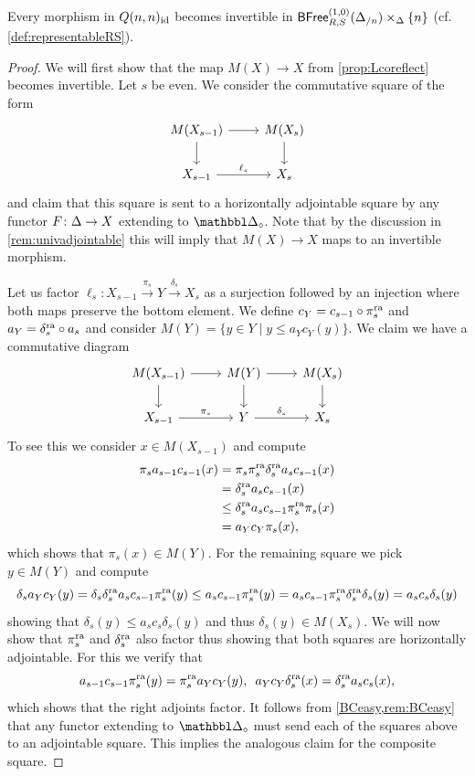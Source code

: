 \documentclass[a4paper,reqno,twoside]{amsart}
\begin{document}
\begin{lemma}\label{lem:deltaisos}
	Every morphism in $Q(n,n)_{\mathrm{id}}$ becomes invertible in $\mathsf{BFree}^{(1,0)}_{R,S}(\Delta_{/n})\times_\Delta \{n\}$ (cf. \cref{def:representableRS}).
\end{lemma}
\begin{proof}
	We will first show that the map $M(X)\to X$ from \cref{prop:Lcoreflect} becomes invertible. Let $s$ be even. We consider the commutative square of the form
	\[
		\begin{tikzcd}
			M(X_{s-1}) \arrow[r] \arrow[d] &  M(X_{s}) \arrow[d] \\
			X_{s-1} \arrow[r,"\ell_s"] & X_{s}
		\end{tikzcd}
	\] 
	and claim that this square is sent to a horizontally adjointable square by any functor $F \colon \Delta \to \relax{X}$ extending to $\ddelta_{\diamond}$. Note that by the discussion in \cref{rem:univadjointable} this will imply that $M(X)\to X$ maps to an invertible morphism.
	
	
	Let us factor $\ell_s\colon X_{s-1}\xrightarrow{\pi_s}Y \xrightarrow{\delta_s} X_{s}$ as a surjection followed by an injection where both maps preserve the bottom element. We define $c_{Y}=c_{s-1} \circ \pi_{s}^{\mathrm{ra}}$ and $a_{Y}=\delta_s^{\mathrm{ra}}\circ a_s$ and consider $M(Y)=\{y \in Y \mid y \leq a_{Y}c_{Y}(y)\}$. We claim we have a commutative diagram
	\[
		\begin{tikzcd}
			M(X_{s-1}) \arrow[d] \arrow[r] & M(Y) \arrow[d] \arrow[r] & M(X_s) \arrow[d] \\
			X_{s-1} \arrow[r,"\pi_s"] & Y \arrow[r,"\delta_s"] & X_s
		\end{tikzcd}
	\]
	To see this we consider $x \in M(X_{s-1})$ and compute
	\[
		\begin{aligned}
			\pi_s a_{s-1}c_{s-1}(x)
			&= \pi_s \pi_s^{\mathrm{ra}} \delta_s^{\mathrm{ra}}a_s c_{s-1}(x) \\
			&= \delta_s^{\mathrm{ra}}a_s c_{s-1}(x) \\
			&\leq \delta_s^{\mathrm{ra}}a_s c_{s-1}\pi_s^{\mathrm{ra}}\pi_s(x) \\
			&= a_Yc_Y\pi_s(x),
		\end{aligned}
	\]
	which shows that $\pi_s(x)\in M(Y)$. For the remaining square we pick $y \in M(Y)$ and compute
	\[
		\delta_s a_Y c_Y(y)=\delta_s \delta_s^{\mathrm{ra}}a_s c_{s-1}\pi_s^{\mathrm{ra}}(y) \leq a_s c_{s-1}\pi_s^{\mathrm{ra}}(y)=a_s c_{s-1}\pi_s^{\mathrm{ra}}\delta_s^{\mathrm{ra}}\delta_s(y)=a_s c_s \delta_s(y)
	\]
	showing that $\delta_s(y) \leq a_s c_s \delta_s(y)$ and thus $\delta_s(y) \in M(X_s)$. We will now show that $\pi_s^{\mathrm{ra}}$ and $\delta_s^{\mathrm{ra}}$ also factor thus showing that both squares are horizontally adjointable. For this we verify that
	\[
		a_{s-1}c_{s-1}\pi_s^{\mathrm{ra}}(y)=\pi_s^{\mathrm{ra}} a_Y c_Y(y), \enspace  a_Y c_Y \delta_s^{\mathrm{ra}}(x)=\delta_s^{\mathrm{ra}}a_s c_s(x),
	\]
	which shows that the right adjoints factor. It follows from \cref{BCeasy,rem:BCeasy} that any functor extending to $\ddelta_{\diamond}$ must send each of the squares above to an adjointable square. This implies the analogous claim for the composite square.
	

\end{proof}
\end{document}
